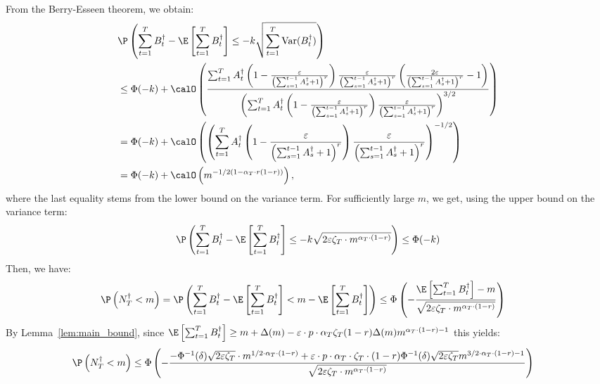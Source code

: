 \documentclass[blindrev]{informs3noheader}
\DeclareMathOperator{\Var}{Var}
\begin{document}
From the Berry-Esseen theorem, we obtain:
\begin{align*}
&\P\left(\sum_{t=1}^T B^\dagger_t - \E\left[\sum_{t=1}^T B^\dagger_t\right] \leq -k\sqrt{\sum_{t=1}^T \Var(B^\dagger_t)}\right)\\
&\leq \Phi(-k) + \calO\left(\frac{\sum_{t=1}^T A^\dagger_t \left(1 - \frac{\varepsilon}{\left(\sum_{s=1}^{t-1} A^\dagger_s +1\right)^r} \right) \frac{\varepsilon}{\left(\sum_{s=1}^{t-1} A^\dagger_s +1\right)^r} \left( \frac{2\varepsilon}{\left(\sum_{s=1}^{t-1} A^\dagger_s +1\right)^r} -1 \right)}{\left(\sum_{t=1}^T A^\dagger_t \left(1 - \frac{\varepsilon}{\left(\sum_{s=1}^{t-1} A^\dagger_s +1\right)^r} \right) \frac{\varepsilon}{\left(\sum_{s=1}^{t-1} A^\dagger_s +1\right)^r} \right)^{3/2}}\right) \\
&= \Phi(-k) + \calO\left(\left(\sum_{t=1}^T A^\dagger_t \left(1 - \frac{\varepsilon}{\left(\sum_{s=1}^{t-1} A^\dagger_s +1\right)^r} \right) \frac{\varepsilon}{\left(\sum_{s=1}^{t-1} A^\dagger_s +1\right)^r} \right)^{-1/2}\right) \\
&= \Phi(-k) + \calO\left(m^{-1/2\left(1-\alpha_T \cdot r(1-r)\right)}\right),
\end{align*}
where the last equality stems from the lower bound on the variance term. For sufficiently large $m$, we get, using the upper bound on the variance term:
\begin{equation}
\P\left(\sum_{t=1}^T B^\dagger_t - \E\left[\sum_{t=1}^T B^\dagger_t\right] \leq -k\sqrt{2\varepsilon \zeta_T \cdot m^{\alpha_T \cdot (1-r)}}\right) \leq \Phi(-k) \label{eq:chernoff_bound}
\end{equation}
Then, we have:
\begin{align*}
\P\left(N^\dagger_T<m\right)
&=\P\left(\sum_{t=1}^T B^\dagger_t - \E\left[\sum_{t=1}^T B^\dagger_t\right] < m - \E\left[\sum_{t=1}^T B^\dagger_t\right]\right)
\leq\Phi\left(-\frac{ \E\left[\sum_{t=1}^T B^\dagger_t\right]-m }{\sqrt{2 \varepsilon \zeta_T \cdot m^{\alpha_T \cdot (1-r)}}}\right)
\end{align*}
By Lemma~\ref{lem:main_bound}, since $\E\left[\sum_{t=1}^T B^\dagger_t\right]\geq m + \Delta(m)- \varepsilon\cdot p\cdot \alpha_T\zeta_T(1-r) \Delta(m)m^{\alpha_T \cdot (1-r)-1}$ this yields:
\begin{align*}
\P\left(N^\dagger_T<m\right)
&\leq \Phi\left(-\frac{-\Phi^{-1}(\delta)\sqrt{2 \varepsilon \zeta_T }\cdot m^{1/2\cdot \alpha_T \cdot (1-r)} + \varepsilon\cdot p\cdot \alpha_T\cdot\zeta_T\cdot(1-r)\Phi^{-1}(\delta) \sqrt{2\varepsilon \zeta_T} m^{3/2 \cdot \alpha_T \cdot (1-r)-1}}{\sqrt{2 \varepsilon \zeta_T \cdot m^{\alpha_T \cdot (1-r)}}}\right)
\end{align*}
\end{document}
